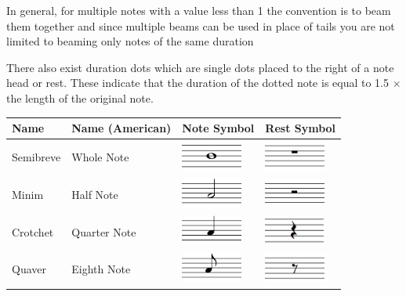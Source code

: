 In general, for multiple notes with a value less than 1 the convention is to beam them together and since multiple beams can be used in place of tails you are not limited to beaming only notes of the same duration

There also exist duration dots which are single dots placed to the right of a note head or rest. These indicate that the duration of the dotted note is equal to 1.5 $\times$ the length of the original note.

\begin{table}[H]
    \renewcommand{\arraystretch}{1.8}
    \centering
    \begin{tabularx}{.7\textwidth}{ llll }
        \toprule

        Name & Name (American) & Note Symbol & Rest Symbol \\
        \midrule
        Semibreve & Whole Note      & \includegraphics[height=1cm]{gfx/music-theory/notehead-semibreve.png}  & \includegraphics[height=1cm]{gfx/music-theory/rest-semibreve.png} \\
        Minim & Half Note           & \includegraphics[height=1cm]{gfx/music-theory/notehead-minim.png}      & \includegraphics[height=1cm]{gfx/music-theory/rest-minim.png}     \\
        Crotchet & Quarter Note     & \includegraphics[height=1cm]{gfx/music-theory/notehead-crotchet.png}   & \includegraphics[height=1cm]{gfx/music-theory/rest-crotchet.png}  \\
        Quaver & Eighth Note        & \includegraphics[height=1cm]{gfx/music-theory/notehead-quaver.png}     & \includegraphics[height=1cm]{gfx/music-theory/rest-quaver.png}    \\

\end{tabularx}
\end{table}
